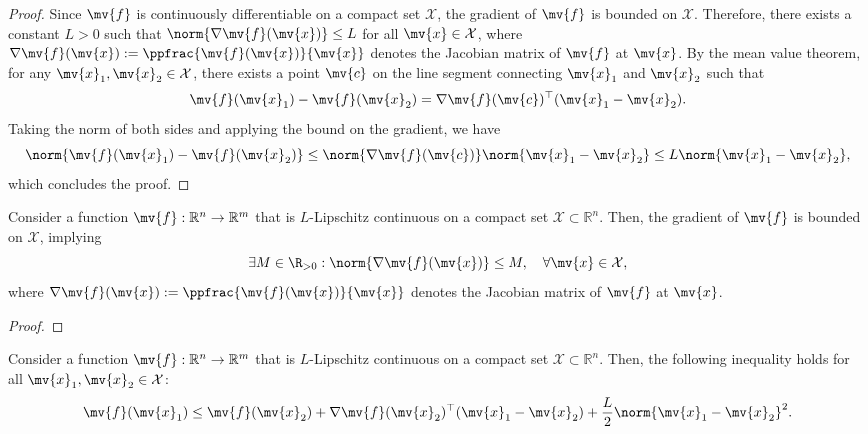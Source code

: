 \begin{proof}

  Since $\mv{f}$ is continuously differentiable on a compact set $\mathcal{X}$, the gradient of $\mv{f}$ is bounded on $\mathcal{X}$.
  Therefore, there exists a constant $L>0$ such that $\norm{\nabla \mv{f}(\mv{x})}\le L$ for all $\mv{x}\in\mathcal{X}$, where $\nabla \mv{f}(\mv{x}):=\ppfrac{\mv{f}(\mv{x})}{\mv{x}}$ denotes the Jacobian matrix of $\mv{f}$ at $\mv{x}$.
  By the mean value theorem, for any $\mv{x}_1,\mv{x}_2\in\mathcal{X}$, there exists a point $\mv{c}$ on the line segment connecting $\mv{x}_1$ and $\mv{x}_2$ such that
  \begin{equation}
    \mv{f}(\mv{x}_1)-\mv{f}(\mv{x}_2) = \nabla \mv{f}(\mv{c})^\top (\mv{x}_1-\mv{x}_2)
    .
  \end{equation}
  Taking the norm of both sides and applying the bound on the gradient, we have
  \begin{equation}
    \norm{\mv{f}(\mv{x}_1)-\mv{f}(\mv{x}_2)} 
    \le 
    \norm{\nabla \mv{f}(\mv{c})}
    \norm{\mv{x}_1-\mv{x}_2} 
    \le 
    L\norm{\mv{x}_1-\mv{x}_2}
    ,
  \end{equation}
  which concludes the proof.

\end{proof}

\begin{lem}
  \label{PRE:lem:lib:grad:bound}
  Consider a function $\mv{f}:\mathbb{R}^n\to\mathbb{R}^m$ that is $L$-Lipschitz continuous on a compact set $\mathcal{X}\subset\mathbb{R}^n$. 
  Then, the gradient of $\mv{f}$ is bounded on $\mathcal{X}$, implying
  \begin{equation}
    \exists
    M\in\R_{>0}
    :
    \norm{
      \nabla \mv{f}(\mv{x})
    }\le M
    ,
    \quad\forall \mv{x}\in\mathcal{X}
    ,
  \end{equation}
  where $\nabla \mv{f}(\mv{x}):=\ppfrac{\mv{f}(\mv{x})}{\mv{x}}$ denotes the Jacobian matrix of $\mv{f}$ at $\mv{x}$.
\end{lem}

\begin{proof}
\end{proof}

\begin{lem}
  \label{PRE:lem:lib:ineq}
  Consider a function $\mv{f}:\mathbb{R}^n\to\mathbb{R}^m$ that is $L$-Lipschitz continuous on a compact set $\mathcal{X}\subset\mathbb{R}^n$. 
  Then, the following inequality holds for all $\mv{x}_1,\mv{x}_2\in\mathcal{X}$:
  \begin{equation}
    \mv{f}(\mv{x}_1)
    \le 
    \mv{f}(\mv{x}_2)
    +
    \nabla\mv{f}(\mv{x}_2)^\top
    (\mv{x}_1-\mv{x}_2)
    +
    \frac{L}{2}
    \norm{\mv{x}_1-\mv{x}_2}^2
    .
  \end{equation}
\end{lem}

